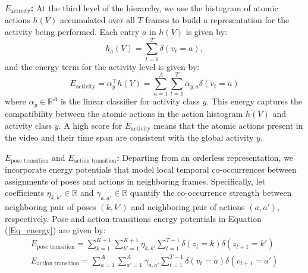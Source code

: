 \noindent \textbf{$E_{\text{activity}}$:} At the third level of the hierarchy, we use the histogram 
of atomic actions $h(V)$
accumulated over all $T$ frames to build a representation for the activity being performed. Each 
entry $a$ in $h(V)$ is given by:
\begin{equation}
h_a(V) = \sum_{t=1}^T \delta(v_t = a),
\end{equation}
and the energy term for the activity level is given by:
\begin{equation} \label{Eq_activityEnergy}
E_{\text{activity}} = \alpha_{y}^\top h(V)=\sum_{a=1}^A \sum_{t=1}^T
\alpha_{y,a} \delta(v_t = a)
\end{equation}
where $\alpha_y \in \mathbb{R}^A$ is the linear classifier for
activity class $y$.
This energy captures the compatibility between the atomic
actions in the action histogram $h(V)$ and activity class $y$.
A high score for
$E_{\text{activity}}$
means that the atomic actions
present in the video and their time span are consistent with the
global activity $y$.

\noindent \textbf{$E_{\text{pose transition}}$} and \textbf{$E_{\text{action 
transition}}$:} Departing from an orderless
representation, we incorporate energy potentials that model local temporal
co-occurrences between assignments of poses and actions in neighboring frames. Specifically,
let coefficients $\eta_{k,k'} \in
\mathbb{R}$ and $\gamma_{a,a'}  \in \mathbb{R}$ quantify the co-occurrence strength
between neighboring pair of poses
$(k,k')$ and neighboring pair of actions $(a,a')$, respectively. Pose and action 
transitions energy potentials in
Equation
(\ref{Eq_energy}) are given by:
\begin{eqnarray}
\label{Eq_poseTransition}
E_{\text{pose transition}} =  \sum_{k=1}^{K+1}\sum_{k'=1}^{K+1}
\eta_{k,k'}
\sum_{t=1}^{T-1} \delta(z_{t}=k)\delta(z_{t+1}=k')
\\
\label{Eq_actionTransition}
E_{\text{action transition}} = \sum_{a=1}^A\sum_{a'=1}^A
\gamma_{a,a'}
\sum_{t=1}^{T-1} \delta(v_{t}=a)\delta(v_{t+1}=a')
\end{eqnarray}

